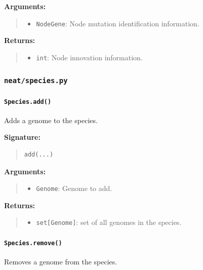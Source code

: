 \documentclass[11pt]{article}
\begin{document}
\textbf{Arguments:}
\begin{quote}
\begin{itemize}
    \item \texttt{NodeGene}: Node mutation identification information.
\end{itemize}
\end{quote}

\textbf{Returns:}
\begin{quote}
\begin{itemize}
    \item \texttt{int}: Node innovation information.
\end{itemize}
\end{quote}


\subsubsection{\texttt{neat/species.py}}

\paragraph{\texttt{Species.add()}}

Adds a genome to the species.

\textbf{Signature:}
\begin{quote}
\begin{verbatim}
add(...)
\end{verbatim}
\end{quote}

\textbf{Arguments:}
\begin{quote}
\begin{itemize}
    \item \texttt{Genome}: Genome to add.
\end{itemize}
\end{quote}

\textbf{Returns:}
\begin{quote}
\begin{itemize}
    \item \texttt{set[Genome]}: set of all genomes in the species.
\end{itemize}
\end{quote}

\paragraph{\texttt{Species.remove()}}

Removes a genome from the species.
\end{document}
